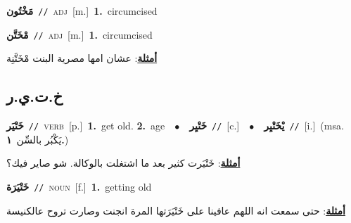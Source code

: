 \documentclass[10pt,a4paper,twoside]{article} %
\begin{document}
\begin{multicols}{2}
{\setlength\topsep{0pt}\textbf{\foreignlanguage{arabic}{مَخْتُون}}\ {\color{gray}\texttt{//}\color{black}}\ \textsc{adj}\ [m.]\ \textbf{1.}~circumcised\ } \vspace{2mm}

{\setlength\topsep{0pt}\textbf{\foreignlanguage{arabic}{مْخَتَّن}}\ {\color{gray}\texttt{//}\color{black}}\ \textsc{adj}\ [m.]\ \textbf{1.}~circumcised\  \begin{flushright}\color{gray}\foreignlanguage{arabic}{\textbf{\underline{\foreignlanguage{arabic}{أمثلة}}}: عشان امها مصرية البنت مْخَتَّنِة}\end{flushright}\color{black}} \vspace{2mm}

\vspace{-3mm}
\subsection*{\color{blue}\foreignlanguage{arabic}{خ.ت.ي.ر}\color{blue}{}} 

{\setlength\topsep{0pt}\textbf{\foreignlanguage{arabic}{خَتْيَر}}\ {\color{gray}\texttt{//}\color{black}}\ \textsc{verb}\ [p.]\ \textbf{1.}~get old.  \textbf{2.}~age\ \ $\bullet$\ \ \setlength\topsep{0pt}\textbf{\foreignlanguage{arabic}{خَتْيِر}}\ {\color{gray}\texttt{//}\color{black}}\ [c.]\ \ $\bullet$\ \ \setlength\topsep{0pt}\textbf{\foreignlanguage{arabic}{يْخَتْيِر}}\ {\color{gray}\texttt{//}\color{black}}\ [i.]\ \color{gray}(msa. \foreignlanguage{arabic}{يَكْبُر بالسِّن}~\foreignlanguage{arabic}{\textbf{١.}})\color{black}\  \begin{flushright}\color{gray}\foreignlanguage{arabic}{\textbf{\underline{\foreignlanguage{arabic}{أمثلة}}}: خَتْيَرت كثير بعد ما اشتغلت بالوكالة. شو صاير فيك؟}\end{flushright}\color{black}} \vspace{2mm}

{\setlength\topsep{0pt}\textbf{\foreignlanguage{arabic}{خَتْيَرَة}}\ {\color{gray}\texttt{//}\color{black}}\ \textsc{noun}\ [f.]\ \textbf{1.}~getting old\  \begin{flushright}\color{gray}\foreignlanguage{arabic}{\textbf{\underline{\foreignlanguage{arabic}{أمثلة}}}: حتى سمعت انه اللهم عافينا على خَتْيَرَتها المرة انجنت وصارت تروح عالكنيسة}\end{flushright}\color{black}} \vspace{2mm}


\end{multicols}
\end{document}
